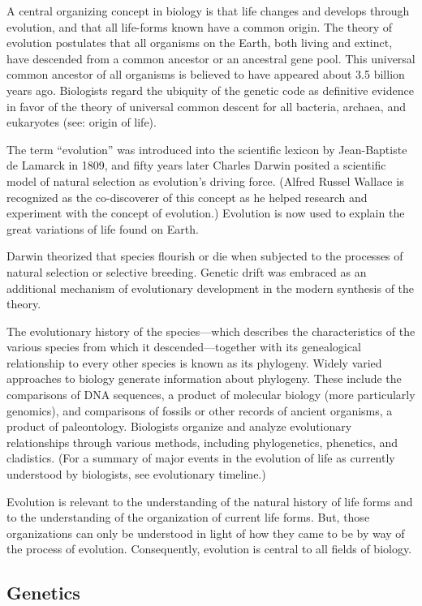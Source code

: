 \documentclass[
]{book}
\begin{document}
A central organizing concept in biology is that life changes and develops through evolution, and that all life-forms known have a common origin. The theory of evolution postulates that all organisms on the Earth, both living and extinct, have descended from a common ancestor or an ancestral gene pool. This universal common ancestor of all organisms is believed to have appeared about 3.5 billion years ago. Biologists regard the ubiquity of the genetic code as definitive evidence in favor of the theory of universal common descent for all bacteria, archaea, and eukaryotes (see: origin of life).

The term ``evolution'' was introduced into the scientific lexicon by Jean-Baptiste de Lamarck in 1809, and fifty years later Charles Darwin posited a scientific model of natural selection as evolution's driving force. (Alfred Russel Wallace is recognized as the co-discoverer of this concept as he helped research and experiment with the concept of evolution.) Evolution is now used to explain the great variations of life found on Earth.

Darwin theorized that species flourish or die when subjected to the processes of natural selection or selective breeding. Genetic drift was embraced as an additional mechanism of evolutionary development in the modern synthesis of the theory.

The evolutionary history of the species---which describes the characteristics of the various species from which it descended---together with its genealogical relationship to every other species is known as its phylogeny. Widely varied approaches to biology generate information about phylogeny. These include the comparisons of DNA sequences, a product of molecular biology (more particularly genomics), and comparisons of fossils or other records of ancient organisms, a product of paleontology. Biologists organize and analyze evolutionary relationships through various methods, including phylogenetics, phenetics, and cladistics. (For a summary of major events in the evolution of life as currently understood by biologists, see evolutionary timeline.)

Evolution is relevant to the understanding of the natural history of life forms and to the understanding of the organization of current life forms. But, those organizations can only be understood in light of how they came to be by way of the process of evolution. Consequently, evolution is central to all fields of biology.

\hypertarget{genetics}{%
\subsection{Genetics}\label{genetics}}
\end{document}
